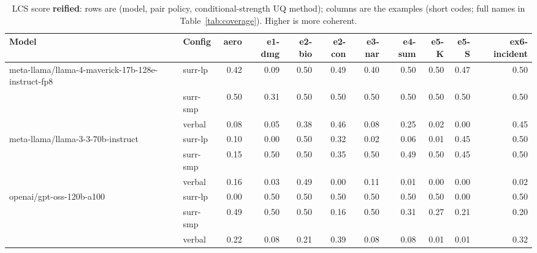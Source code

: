\documentclass[11pt]{article}
\begin{document}
\begin{table}[htbp]
\centering
\footnotesize
\setlength{\tabcolsep}{3.5pt}
\caption{LCS score \textbf{reified}: rows are (model, pair policy, conditional-strength UQ method); columns are the examples (short codes; full names in Table~\ref{tab:coverage}). Higher is more coherent.}
\label{tab:reified}
\begin{tabular}{llrrrrrrrrr}
\toprule
\textbf{Model} & \textbf{Config} & \textbf{aero} & \textbf{e1-dmg} & \textbf{e2-bio} & \textbf{e2-con} & \textbf{e3-nar} & \textbf{e4-sum} & \textbf{e5-K} & \textbf{e5-S} & \textbf{ex6-incident} \\
\midrule
meta-llama/llama-4-maverick-17b-128e-instruct-fp8 & surr-lp & 0.42 & 0.09 & 0.50 & 0.49 & 0.40 & 0.50 & 0.50 & 0.47 & 0.50 \\
 & surr-smp & 0.50 & 0.31 & 0.50 & 0.50 & 0.50 & 0.50 & 0.50 & 0.50 & 0.50 \\
 & verbal & 0.08 & 0.05 & 0.38 & 0.46 & 0.08 & 0.25 & 0.02 & 0.00 & 0.45 \\
\midrule
meta-llama/llama-3-3-70b-instruct & surr-lp & 0.10 & 0.00 & 0.50 & 0.32 & 0.02 & 0.06 & 0.01 & 0.45 & 0.50 \\
 & surr-smp & 0.15 & 0.50 & 0.50 & 0.35 & 0.50 & 0.49 & 0.50 & 0.45 & 0.50 \\
 & verbal & 0.16 & 0.03 & 0.49 & 0.00 & 0.11 & 0.01 & 0.00 & 0.00 & 0.02 \\
\midrule
openai/gpt-oss-120b-a100 & surr-lp & 0.00 & 0.50 & 0.50 & 0.50 & 0.50 & 0.50 & 0.50 & 0.00 & 0.50 \\
 & surr-smp & 0.49 & 0.50 & 0.50 & 0.16 & 0.50 & 0.31 & 0.27 & 0.21 & 0.20 \\
 & verbal & 0.22 & 0.08 & 0.21 & 0.39 & 0.08 & 0.08 & 0.01 & 0.01 & 0.32 \\
\bottomrule
\end{tabular}
\end{table}
\end{document}
